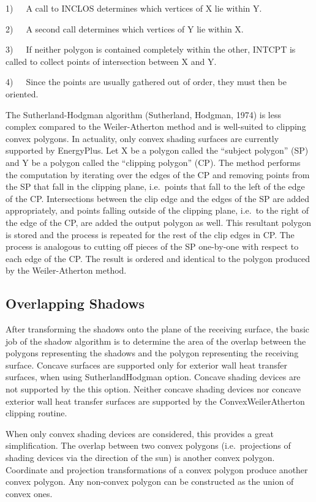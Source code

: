 1)~~~A call to INCLOS determines which vertices of X lie within Y.

2)~~~A second call determines which vertices of Y lie within X.

3)~~~If neither polygon is contained completely within the other, INTCPT is called to collect points of intersection between X and Y.

4)~~~Since the points are usually gathered out of order, they must then be oriented.

The Sutherland-Hodgman algorithm (Sutherland, Hodgman, 1974) is less complex compared to the Weiler-Atherton method and is well-suited to clipping convex polygons. In actuality, only convex shading surfaces are currently supported by EnergyPlus. Let X be a polygon called the ``subject polygon'' (SP) and Y be a polygon called the ``clipping polygon'' (CP). The method performs the computation by iterating over the edges of the CP and removing points from the SP that fall in the clipping plane, i.e.~points that fall to the left of the edge of the CP. Intersections between the clip edge and the edges of the SP are added appropriately, and points falling outside of the clipping plane, i.e.~to the right of the edge of the CP, are added the output polygon as well. This resultant polygon is stored and the process is repeated for the rest of the clip edges in CP. The process is analogous to cutting off pieces of the SP one-by-one with respect to each edge of the CP. The result is ordered and identical to the polygon produced by the Weiler-Atherton method.

\subsection{Overlapping Shadows}\label{overlapping-shadows}

After transforming the shadows onto the plane of the receiving surface, the basic job of the shadow algorithm is to determine the area of the overlap between the polygons representing the shadows and the polygon representing the receiving surface. Concave surfaces are supported only for exterior wall heat transfer surfaces, when using SutherlandHodgman option. Concave shading devices are not supported by the this option. Neither concave shading devices nor concave exterior wall heat transfer surfaces are supported by the ConvexWeilerAtherton clipping routine.

When only convex shading devices are considered, this provides a great simplification. The overlap between two convex polygons (i.e.~projections of shading devices via the direction of the sun) is another convex polygon. Coordinate and projection transformations of a convex polygon produce another convex polygon. Any non-convex polygon can be constructed as the union of convex ones.


